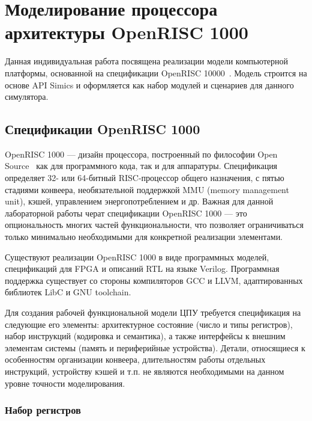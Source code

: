 \chapter{Моделирование процессора архитектуры OpenRISC 1000}\label{chap:lab06}

Данная индивидуальная работа посвящена реализации модели компьютерной платформы, основанной на спецификации OpenRISC 10000~\cite{or1k-spec}. Модель строится на основе API Simics и оформляется как набор модулей и сценариев для данного симулятора.

\section{Спецификации OpenRISC 1000}

OpenRISC 1000 --- дизайн процессора, построенный по философии Open Source~\cite{open-source-definition-ru} как для программного кода, так и для аппаратуры. Спецификация определяет 32- или 64-битный RISC-процессор общего назначения, с пятью стадиями конвеера, необязательной поддержкой MMU (\abbr memory management unit), кэшей, управлением энергопотреблением и др. Важная для данной лабораторной работы черат спецификации OpenRISC 1000 --- это опциональность многих частей функциональности, что позволяет ограничиваться только минимально необходимыми для конкретной реализации элементами.

Существуют реализации OpenRISC 1000 в виде программных моделей, спецификаций для FPGA и описаний RTL на языке Verilog. Программная поддержка существует со стороны компиляторов GCC и LLVM, адаптированных библиотек LibC и GNU toolchain.

Для создания рабочей функциональной модели ЦПУ требуется спецификация на следующие его элементы: архитектурное состояние (число и типы регистров), набор инструкций (кодировка и семантика), а также интерфейсы к внешним элементам системы (память и периферийные устройства). Детали, относящиеся к особенностям организации конвеера, длительностям работы отдельных инструкций, устройству кэшей и т.п. не являются необходимыми на данном уровне точности моделирования.

\subsection{Набор регистров}

